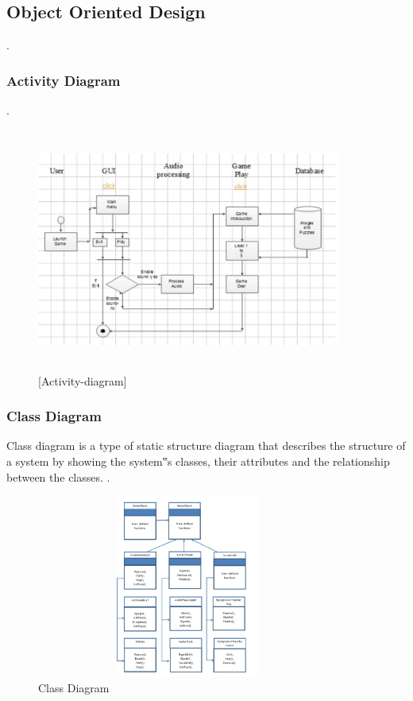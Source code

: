 \subsection{Object Oriented Design}
\hspace{1cm}\cite{DBLP:journals/ivc/KadyrovP03}.\\

\subsubsection{Activity Diagram}
\hspace{1cm} \cite{DBLP:journals/ivc/KadyrovP03}.
\vspace {0.5cm}
\begin{figure}[htbp]
	\centering
	\includegraphics[width=10cm,height=8cm]{activity.jpg}
	\caption{[Activity-diagram]}
\end{figure}




\subsubsection{Class Diagram}
\hspace{1cm}Class diagram  is a type of static structure diagram that describes the structure of a system by showing the system‟s classes, their attributes and the relationship between the classes. \cite{DBLP:journals/ivc/KadyrovP03}.
\vspace {0.5cm}
\begin{figure}[htbp]
	\centering
	\includegraphics[width=10cm,height=6cm]{class.JPG}
	\caption{Class Diagram}\end{figure}
